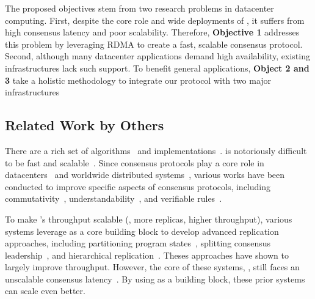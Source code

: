 The proposed objectives stem from two research problems in datacenter 
computing. First, despite the core role and wide deployments of \paxos, it 
suffers from high consensus latency and poor scalability. Therefore, 
\textbf{Objective 1} addresses this problem by leveraging RDMA to create a 
fast, scalable consensus protocol. Second, although many 
datacenter applications demand high availability, existing infrastructures lack 
such support. To benefit general applications, \textbf{Object 2 and 3} take a 
holistic methodology to integrate our protocol with two major infrastructures


\vspace{-.15in}\subsection{Related Work by Others} 
\label{sec:others-work}\vspace{-.075in}

There are a rich set of \paxos 
algorithms~\cite{paxos:practical,paxos,paxos:simple,paxos:complex,
epaxos:sosp13} 
and implementations~\cite{paxos:live,paxos:practical,chubby:osdi,crane:sosp15}. 
\paxos is notoriously difficult to be fast and 
scalable~\cite{ellis:thesis,manos:hotdep10,scatter:sosp11}. Since consensus 
protocols play a core role in datacenters~\cite{matei:hotcloud11, mesos:nsdi11, 
datacenter:os} and worldwide 
distributed systems~\cite{spanner:osdi12,mencius:osdi08}, various works 
have been conducted to improve specific aspects of consensus protocols, 
including commutativity~\cite{epaxos:sosp13}, 
understandability~\cite{raft:usenix14,paxos}, and verifiable 
rules~\cite{modist:nsdi09,demeter:sosp11}.

To make \paxos's throughput scalable (\ie, more replicas, higher throughput), 
various systems leverage \paxos as a core building block to develop advanced 
replication approaches, including partitioning program 
states~\cite{scatter:sosp11,ssmr:dsn14}, splitting consensus 
leadership~\cite{mencius:osdi08,spaxos:srds12}, and hierarchical 
replication~\cite{manos:hotdep10,scatter:sosp11}. Theses approaches have shown 
to largely improve throughput. However, the core of these systems, 
\paxos, still faces an unscalable consensus 
latency~\cite{ellis:thesis,scatter:sosp11,manos:hotdep10}. By using \xxx as a 
building block, these prior systems can scale even better.

